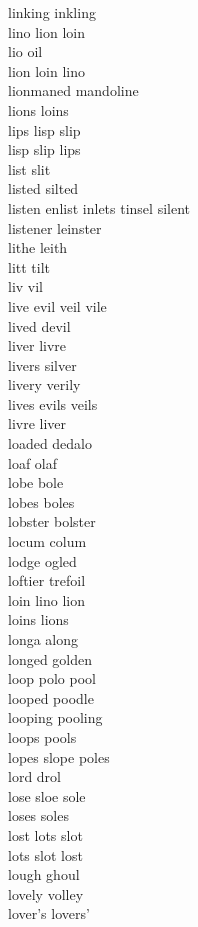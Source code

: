 linking inkling\\
lino lion loin\\
lio oil\\
lion loin lino\\
lionmaned mandoline\\
lions loins\\
lips lisp slip\\
lisp slip lips\\
list slit\\
listed silted\\
listen enlist inlets tinsel silent\\
listener leinster\\
lithe leith\\
litt tilt\\
liv vil\\
live evil veil vile\\
lived devil\\
liver livre\\
livers silver\\
livery verily\\
lives evils veils\\
livre liver\\
loaded dedalo\\
loaf olaf\\
lobe bole\\
lobes boles\\
lobster bolster\\
locum colum\\
lodge ogled\\
loftier trefoil\\
loin lino lion\\
loins lions\\
longa along\\
longed golden\\
loop polo pool\\
looped poodle\\
looping pooling\\
loops pools\\
lopes slope poles\\
lord drol\\
lose sloe sole\\
loses soles\\
lost lots slot\\
lots slot lost\\
lough ghoul\\
lovely volley\\
lover's lovers'\\
